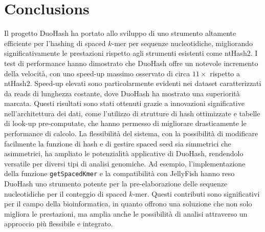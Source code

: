 \chapter{Conclusions}
\label{chp:conclusions}

Il progetto DuoHash ha portato allo sviluppo di uno strumento altamente efficiente per l'hashing di spaced $k$-mer per sequenze nucleotidiche, migliorando significativamente le prestazioni rispetto agli strumenti esistenti come ntHash2. I test di performance hanno dimostrato che DuoHash offre un notevole incremento della velocità, con uno speed-up massimo osservato di circa $11\times$ rispetto a ntHash2. Speed-up elevati sono particolarmente evidenti nei dataset caratterizzati da reads di lunghezza costante, dove DuoHash ha mostrato una superiorità marcata. Questi risultati sono stati ottenuti grazie a innovazioni significative nell'architettura dei dati, come l'utilizzo di strutture di hash ottimizzate e tabelle di look-up pre-computate, che hanno permesso di migliorare drasticamente le performance di calcolo. La flessibilità del sistema, con la possibilità di modificare facilmente la funzione di hash e di gestire spaced seed sia simmetrici che asimmetrici, ha ampliato le potenzialità applicative di DuoHash, rendendolo versatile per diversi tipi di analisi genomiche. Ad esempio, l'implementazione della funzione \verb|getSpacedKmer| e la compatibilità con JellyFish hanno reso DuoHash uno strumento potente per la pre-elaborazione delle sequenze nucleotidiche per il conteggio di spaced $k$-mer. Questi contributi sono significativi per il campo della bioinformatica, in quanto offrono una soluzione che non solo migliora le prestazioni, ma amplia anche le possibilità di analisi attraverso un approccio più flessibile e integrato. 

